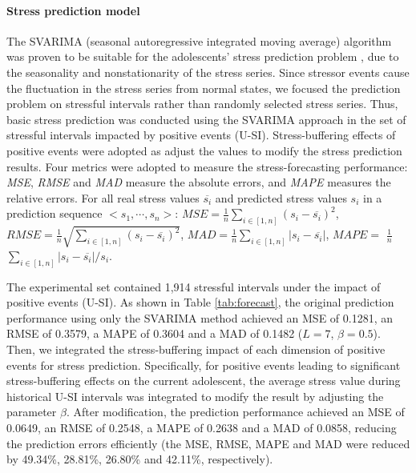 \documentclass[5p,times,numbers,authoryear]{elsarticle}
\begin{document}
\paragraph{Stress prediction model}
The 
{SVARIMA (seasonal autoregressive integrated moving average)} 
algorithm was proven to be suitable for the adolescents' stress prediction problem \citep{Li2015Predicting, Shumway2006Time},
due to the seasonality and nonstationarity of the stress series. Since stressor events cause the fluctuation in the stress series from normal states, 
we focused the prediction problem on stressful intervals rather than randomly selected stress series.
Thus, basic stress prediction was conducted using the SVARIMA approach in the set of stressful intervals impacted by positive events (U-SI).
Stress-buffering effects of positive events were adopted as adjust the values to modify the stress prediction results.
Four metrics were adopted to measure the stress-forecasting performance:
\emph{MSE}, \emph{RMSE} and \emph{MAD} measure the absolute errors, and \emph{MAPE} measures the relative errors.
For all real stress values $\overline{s_i}$ and predicted stress values $s_i$ in a prediction sequence $<s_1,\cdots,s_n>$:
$MSE = \frac{1}{n}\sum_{i\in[1,n]}(s_i-\overline{s_i})^2$,
$RMSE = \frac{1}{n}\sqrt{\sum_{i\in[1,n]}(s_i-\overline{s_i})^2}$,
$MAD = \frac{1}{n}\sum_{i\in[1,n]}|s_i-\overline{s_i}|$,
$MAPE = $ $\frac{1}{n}$ $\sum_{i\in[1,n]}{|s_i-\overline{s_i}|/s_i}$.

The experimental set contained 1,914 stressful intervals under the impact of positive events (U-SI).
As shown in Table \ref{tab:forecast}, 
the original prediction performance using only the SVARIMA method
achieved an MSE of 0.1281, an RMSE of 0.3579, a MAPE of 0.3604 and a MAD of 0.1482 ($L = 7$, $\beta = 0.5$).
Then, we integrated the stress-buffering impact of each dimension of positive events for stress prediction.
Specifically, for positive events leading to significant stress-buffering effects on the current adolescent, 
the average stress value during historical U-SI intervals was integrated to modify the result by adjusting the parameter $\beta$.
After modification, the prediction performance achieved an MSE of 0.0649, an RMSE of 0.2548, a MAPE of 0.2638 and a MAD of 0.0858,
reducing the prediction errors efficiently (the MSE, RMSE, MAPE and MAD were reduced by 49.34\%, 28.81\%, 26.80\% and 42.11\%, respectively).
\end{document}
